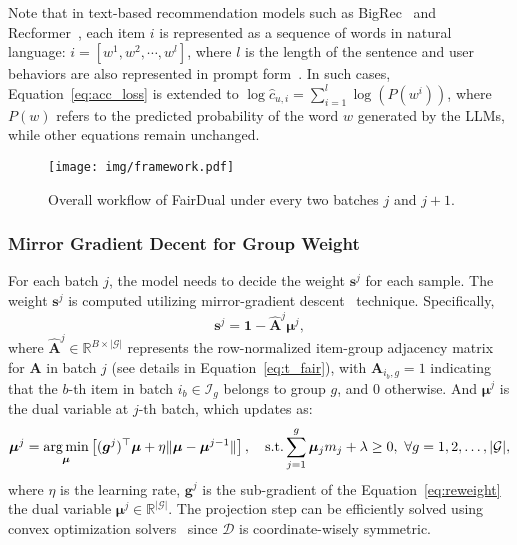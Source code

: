 Note that in text-based recommendation models such as BigRec~\citep{bao2023bi} and Recformer~\citep{Recformer}, each item $i$ is represented as a sequence of words in natural language: $i = [w^1, w^2, \cdots, w^l]$, where $l$ is the length of the sentence and user behaviors are also represented in prompt form~\citep{bao2023bi}. In such cases, Equation~\eqref{eq:acc_loss} is extended to $\log {\hat{c}_{u,i}} = \sum_{i=1}^l\log(P(w^i))$, where $P(w)$ refers to the predicted probability of the word $w$ generated by the LLMs, while other equations remain unchanged.

\begin{figure}
    \centering
    \texttt{[image: img/framework.pdf]}
    \caption{Overall workflow of FairDual under every two batches $j$ and $j+1$. }
    \label{fig:framework}
    \vspace{-0.3cm}
\end{figure}

\subsubsection{Mirror Gradient Decent for Group Weight}

For each batch $j$, the model needs to decide the weight $\bm{s}^j$ for each sample. The weight $\bm{s}^j$ is computed utilizing mirror-gradient descent~\citep{balseiro2021regularized} technique. Specifically, 
\begin{equation}\label{eq:weight}
    \bm{s}^j = \bm{1} - \hat{\bm{A}}^j\bm{\mu}^j,
\end{equation}
where $\hat{\bm{A}}^j\in\mathbb{R}^{B\times|\mathcal{G}|}$ represents the row-normalized item-group adjacency matrix for $\bm{A}$ in batch $j$ (see details in Equation~\eqref{eq:t_fair}), with $\bm{A}_{i_b, g} = 1$ indicating that the $b$-th item in batch $i_b\in \mathcal{I}_g$ belongs to group $g$, and 0 otherwise. And $\bm{\mu}^j$ is the dual variable at $j$-th batch, which updates as:
\begin{equation}\label{eq:dual_update}
\begin{aligned}
      \bm{\mu}^j =  \operatorname*{arg\,min}_{\bm{\mu}} \left[(\bm{g}^j)^{\top}\bm{\mu} + \eta \|\bm{\mu}-\bm{\mu}^{j-1}\|\right], \quad \textrm{s.t.} \sum_{j=1}^{g} \bm{\mu}_jm_j + \lambda \ge 0,~ \forall g = 1, 2 , \ldots, |\mathcal{G}|, 
\end{aligned}
\end{equation}
where $\eta$ is the learning rate, $\bm{g}^j$ is the sub-gradient of the Equation~\eqref{eq:reweight} \wrt the dual variable $\bm{\mu}^j\in\mathbb{R}^{|\mathcal{G}|}$. The projection step can be efficiently solved using convex optimization solvers~\citep{balseiro2021regularized} since $\mathcal{D}$ is coordinate-wisely symmetric. 

